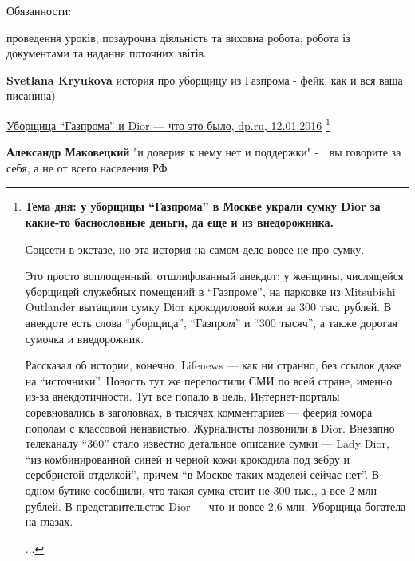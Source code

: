 \begin{itemize}
\begin{itemize}
{Обязанности:

проведення уроків,
позаурочна діяльність та виховна робота;
робота із документами та надання поточних звітів.
}

 
\textbf{Svetlana Kryukova} история про уборщицу из Газпрома - фейк, как и вся ваша писанина)

\href{https://www.dp.ru/a/2016/01/12/Uborshhica_Gazproma_i_Dio}{Уборщица \enquote{Газпрома} и Dior — что это было, dp.ru, 12.01.2016}
\footnote{
{\bfseries Тема дня: у уборщицы \enquote{Газпрома} в Москве украли сумку Dior за какие-то
баснословные деньги, да еще и из внедорожника.}

Соцсети в экстазе, но эта
история на самом деле вовсе не про сумку.  

Это просто воплощенный,
отшлифованный анекдот: у женщины, числящейся уборщицей служебных помещений в
\enquote{Газпроме}, на парковке из Mitsubishi Outlander вытащили сумку Dior
крокодиловой кожи за 300 тыс. рублей. В анекдоте есть слова \enquote{уборщица},
\enquote{Газпром} и \enquote{300 тысяч}, а также дорогая сумочка и внедорожник.

Рассказал об истории, конечно, Lifenews — как ни странно, без ссылок даже на
\enquote{источники}. Новость тут же перепостили СМИ по всей стране, именно из-за
анекдотичности. Тут все попало в цель. Интернет-порталы соревновались в
заголовках, в тысячах комментариев — феерия юмора пополам с классовой
ненавистью. Журналисты позвонили в Dior. Внезапно телеканалу \enquote{360} стало
известно детальное описание сумки — Lady Dior, \enquote{из комбинированной синей и
черной кожи крокодила под зебру и серебристой отделкой}, причем \enquote{в Москве таких
моделей сейчас нет}. В одном бутике сообщили, что такая сумка стоит не 300
тыс., а все 2 млн рублей. В представительстве Dior — что и вовсе 2,6 млн.
Уборщица богатела на глазах.

...
}

 
\textbf{Александр Маковецкий} "и доверия к нему нет и поддержки" - 🤔 вы говорите за себя, а не от всего населения РФ


\end{itemize}
\end{itemize}
